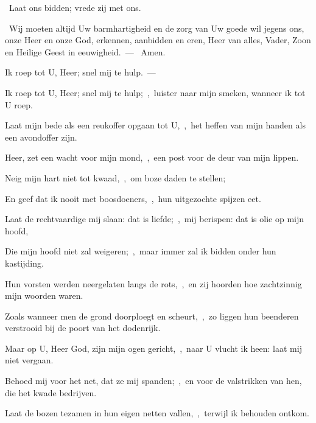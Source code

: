 \documentclass[12pt,twoside,a5paper]{article}
\begin{document}
\begin{halfparskip}
   \dd~Laat ons bidden; vrede zij met ons.

  \cc~Wij moeten altijd Uw barmhartigheid en de zorg van Uw goede wil jegens ons, onze Heer en onze God, erkennen, aanbidden en eren, Heer van alles, Vader, Zoon en Heilige Geest in eeuwigheid.~--- \rr~Amen.
\end{halfparskip}



\begin{halfparskip}
   Ik roep tot U, Heer; snel mij te hulp.~--- 

  Ik roep tot U, Heer; snel mij te hulp;~\sep\ luister naar mijn smeken, wanneer ik tot U roep.

  Laat mijn bede als een reukoffer opgaan tot U,~\sep\ het heffen van mijn handen als een avondoffer zijn.

  Heer, zet een wacht voor mijn mond,~\sep\ een post voor de deur van mijn lippen.

  Neig mijn hart niet tot kwaad,~\sep\ om boze daden te stellen;

  En geef dat ik nooit met boosdoeners,~\sep\ hun uitgezochte spijzen eet.

  Laat de rechtvaardige mij slaan: dat is liefde;~\sep\ mij berispen: dat is olie op mijn hoofd,

  Die mijn hoofd niet zal weigeren;~\sep\ maar immer zal ik bidden onder hun kastijding.

  Hun vorsten werden neergelaten langs de rots,~\sep\ en zij hoorden hoe zachtzinnig mijn woorden waren.

  Zoals wanneer men de grond doorploegt en scheurt,~\sep\ zo liggen hun beenderen verstrooid bij de poort van het dodenrijk.

  Maar op U, Heer God, zijn mijn ogen gericht,~\sep\ naar U vlucht ik heen: laat mij niet vergaan.

  Behoed mij voor het net, dat ze mij spanden;~\sep\ en voor de valstrikken van hen, die het kwade bedrijven.

  Laat de bozen tezamen in hun eigen netten vallen,~\sep\ terwijl ik behouden ontkom.
\end{halfparskip}
\end{document}
